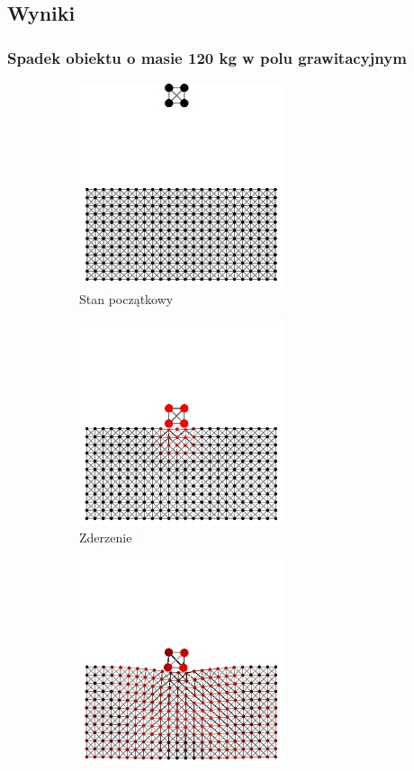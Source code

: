 \documentclass[12pt, letterpaper]{report}
\begin{document}
    \clearpage
    \subsection{Wyniki}
    \subsubsection{Spadek obiektu o masie 120 kg w polu grawitacyjnym}
    \begin{figure}[h]

        \begin{subfigure}{0.5\textwidth}
            \centering
            \includegraphics[width=6cm, height=6cm]{collision_2x2_24x12_mass30_1} 
            \caption{Stan początkowy}
        \end{subfigure}
        \begin{subfigure}{0.5\textwidth}
            \centering
            \includegraphics[width=6cm, height=6cm]{collision_2x2_24x12_mass30_2}
            \caption{Zderzenie}
        \end{subfigure}
        \begin{subfigure}{0.5\textwidth}
            \centering
            \includegraphics[width=6cm, height=6cm]{collision_2x2_24x12_mass30_3}

\end{subfigure}
\end{figure}
\end{document}
